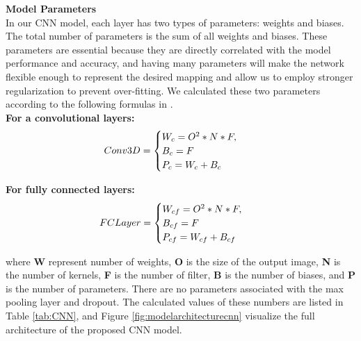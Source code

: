 \documentclass{vldb}
\begin{document}
\textbf{Model Parameters}\\

In our CNN model, each layer has two types of parameters: weights and biases. The total number of parameters is the sum of all weights and biases. These parameters are essential because they are directly correlated with the model performance and accuracy, and having many parameters will make the network flexible enough to represent the desired mapping and allow us to employ stronger regularization to prevent over-fitting. We calculated these two parameters according to the following formulas in \cite{mallik_2018}. \\

\textbf{For a convolutional layers:}\\
\begin{align}
   & Conv 3D=\begin{cases}
\large W_{c} = O^{2} \ast N \ast F, \\
\large B_{c} = F\,\\
\large P_{c} = W_{c} + B_{c}\
\end{cases}
\end{align}


\textbf{For fully connected layers:}\\
\begin{align}
   & FC Layer=\begin{cases}
\large W_{cf} = O^{2} \ast N \ast F, \\
\large B_{cf} = F\,\\
\large P_{cf} = W_{cf} + B_{cf}\
\end{cases}
\end{align}


where \textbf{W} represent number of weights, \textbf{O} is the size of the output image, \textbf{N} is the number of kernels, \textbf{F} is the number of filter, \textbf{B} is the number of biases, and \textbf{P} is the number of parameters.
There are no parameters associated with the max pooling layer and dropout. The calculated values of these numbers are listed in Table \ref{tab:CNN}, and Figure \ref{fig:modelarchitecturecnn} visualize the full architecture of the proposed CNN model.
\end{document}
